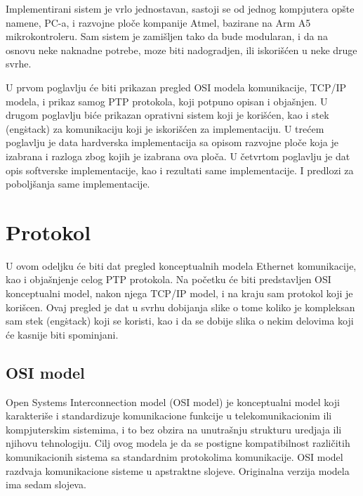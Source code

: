\documentclass[a4paper,12pt, master]{etf}
\begin{document}
	Implementirani sistem je vrlo jednostavan, sastoji se od jednog kompjutera 
	op\v{s}te namene, PC-a, i razvojne plo\v{c}e kompanije Atmel, bazirane na 
	Arm A5 mikrokontroleru. Sam sistem je zami\v{s}ljen tako da bude modularan, 
	i da na osnovu neke naknadne potrebe, moze biti nadogradjen, ili 
	iskori\v{s}\'{c}en u neke druge svrhe.

	U prvom poglavlju \'{c}e biti prikazan pregled OSI modela komunikacije, 
	TCP/IP modela, i prikaz samog PTP protokola, koji potpuno opisan i 
	obja\v{s}njen. U drugom poglavlju bi\'{c}e prikazan oprativni sistem koji 
	je kori\v{s}\'{c}en, kao i stek (eng\. stack) za komunikaciju koji je 
	iskori\v{s}\'{c}en za implementaciju. U tre\'{c}em poglavlju je data 
	hardverska implementacija sa opisom razvojne plo\v{c}e koja je izabrana i 
	razloga zbog kojih je izabrana ova plo\v{c}a. U \v{c}etvrtom poglavlju je 
	dat opis softverske implementacije, kao i rezultati same implementacije. I 
	predlozi za pobolj\v{s}anja same implementacije.

	\newpage

	\chapter{Protokol}

	U ovom odeljku \'{c}e biti dat pregled konceptualnih modela Ethernet
	komunikacije, kao i obja\v{s}njenje	celog PTP protokola. Na po\v{c}etku
	\'{c}e biti predstavljen OSI konceptualni model, nakon njega TCP/IP	model,
	i na kraju sam protokol koji je kori\v{s}cen. Ovaj pregled je dat u svrhu
	dobijanja slike o tome koliko je kompleksan sam stek (eng\. stack) koji se
    koristi, kao i da se dobije slika o nekim delovima koji \'{c}e kasnije biti
    spominjani.

	\section{OSI model}

	Open Systems Interconnection model (OSI model) je konceptualni model koji
	karakteri\v{s}e i standardizuje komunikacione funkcije u telekomunikacionim
	ili kompjuterskim sistemima, i to bez obzira na unutra\v{s}nju strukturu
	uredjaja ili njihovu tehnologiju. Cilj ovog modela je da se postigne
	kompatibilnost razli\v{c}itih komunikacionih sistema sa standardnim
	protokolima komunikacije. OSI model razdvaja komunikacione sisteme u
	apstraktne slojeve.	Originalna verzija modela ima sedam slojeva.
\end{document}
